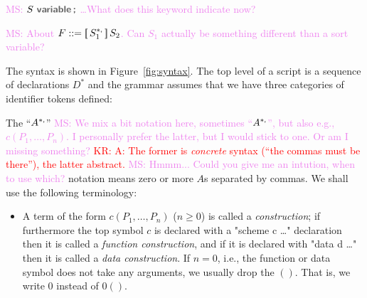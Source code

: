 \documentclass[letterpaper,11pt]{article}
\newcommand{\KR}[1]{\textcolor{red}{KR: #1}}
\newcommand{\MS}[1]{\textcolor{violet}{MS: #1}}
\begin{document}
\MS{$S~\kw{variable}\,\kw;$ \ldots What does this keyword indicate now?}

\MS{About $F ::= \kw[\,S_1^{*\kw,}\,\kw]\,S_2$. Can $S_1$ actually be something different than a sort variable?}

\begin{definition}\label{def:syntax}
  The \hax syntax is shown in Figure~\ref{fig:syntax}. The top level of a \hax script is a sequence
  of declarations $D^*$ and the grammar assumes that we have three categories of identifier tokens
  defined:
  The ``$A^{*\kw,}$'' 
  \MS{We mix a bit notation here, sometimes ``$A^{*\kw,}$'', but also e.g., $c(P_1,…,P_n)$. I
    personally prefer the latter, but I would stick to one. Or am I missing something?}
  \KR{A: The former is \emph{concrete} syntax (``the commas must be there''), the latter abstract.} 
  \MS{Hmmm... Could you give me an intution, when to use which?}
  notation means zero or more $A$s separated by commas. We shall use the
  following terminology:
  \begin{itemize}

  \item A term of the form $c(P_1,…,P_n)$ ($n≥0$) is called a \emph{construction}; if furthermore
    the top symbol $c$ is declared with a "scheme c {…}" declaration then it is called a
    \emph{function construction}, and if it is declared with "data d {…}" then it is called a
    \emph{data construction}. If $n=0$, i.e., the function or data symbol does not take any
      arguments, we usually drop the $()$. That is, we write $0$ instead of $0()$.
    

\end{itemize}
\end{definition}
\end{document}
